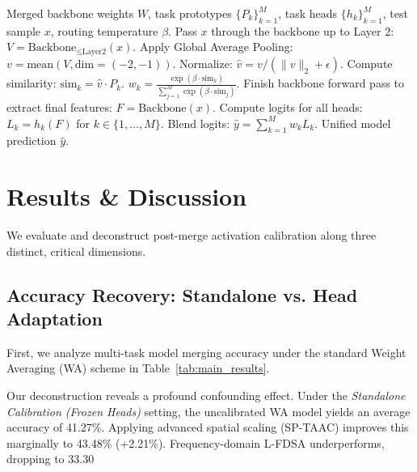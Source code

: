 \documentclass{article}
\theoremstyle{plain}
\theoremstyle{definition}
\theoremstyle{remark}
\begin{document}
\begin{algorithm}[tb]
\caption{Self-Routing Activation Calibration (SRAC)}
\label{alg:srac}
\begin{algorithmic}[1]
 Merged backbone weights $W$, task prototypes $\{P_k\}_{k=1}^{M}$, task heads $\{h_k\}_{k=1}^{M}$, test sample $x$, routing temperature $\beta$.
\STATE Pass $x$ through the backbone up to Layer 2:
\STATE $V = \text{Backbone}_{\le \text{Layer2}}(x)$.
\STATE Apply Global Average Pooling: $v = \text{mean}(V, \text{dim}=(-2, -1))$.
\STATE Normalize: $\hat{v} = v / (\|v\|_2 + \epsilon)$.
    \STATE Compute similarity: $\text{sim}_k = \hat{v} \cdot P_k$.
\ENDFOR
{}
    \STATE $w_k = \frac{\exp(\beta \cdot \text{sim}_k)}{\sum_{j=1}^{M} \exp(\beta \cdot \text{sim}_j)}$.
\ENDFOR
{}
\STATE Finish backbone forward pass to extract final features:
\STATE $F = \text{Backbone}(x)$.
\STATE Compute logits for all heads: $L_k = h_k(F)$ for $k \in \{1, \dots, M\}$.
\STATE Blend logits: $\hat{y} = \sum_{k=1}^{M} w_k L_k$.
 Unified model prediction $\hat{y}$.
\end{algorithmic}
\end{algorithm}

\section{Results \& Discussion}
\label{sec:results}

We evaluate and deconstruct post-merge activation calibration along three distinct, critical dimensions.

\subsection{Accuracy Recovery: Standalone vs. Head Adaptation}
First, we analyze multi-task model merging accuracy under the standard Weight Averaging (WA) scheme in Table~\ref{tab:main_results}. 

Our deconstruction reveals a profound confounding effect. Under the \textit{Standalone Calibration (Frozen Heads)} setting, the uncalibrated WA model yields an average accuracy of 41.27\%. Applying advanced spatial scaling (SP-TAAC) improves this marginally to 43.48\% (+2.21\%). Frequency-domain L-FDSA underperforms, dropping to 33.30%
\end{document}

